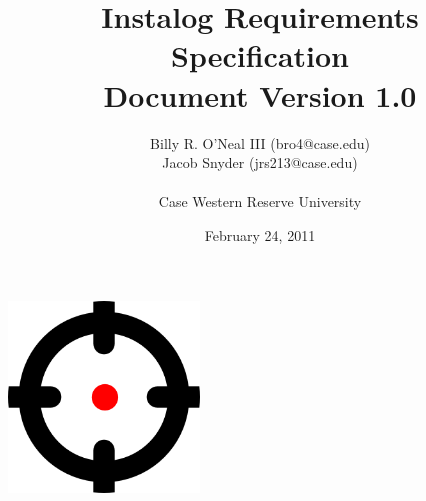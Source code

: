 \documentclass[letterpaper,12pt]{article}
\title{Instalog Requirements Specification \\
Document Version 1.0}
\author{
Billy R. O'Neal III (bro4@case.edu) \\
Jacob Snyder (jrs213@case.edu) \\ \\
Case Western Reserve University
}
\date{February 24, 2011}
\begin{document}
\maketitle
\vspace{1in}
\begin{center}
\includegraphics[width=2in, height=2in]{figures/InstalogLogo.png}
\end{center}
\newpage

\tableofcontents
\newpage


\newpage


\newpage


\newpage


\newpage


\newpage


\clearpage


\newpage


\newpage


\end{document}
